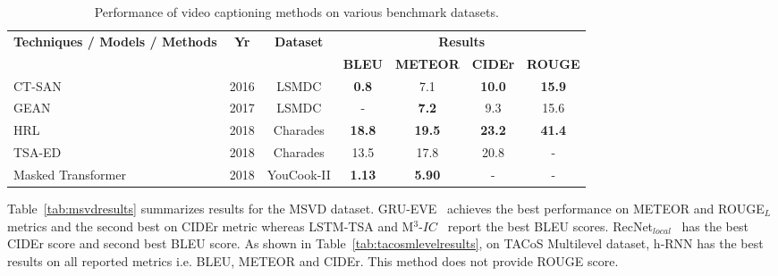 \documentclass[10pt,journal,compsoc]{IEEEtran}
\begin{document}
\begin{table*}[htbp]
  \centering
  \small
  \setlength{\tabcolsep}{10.0pt}       %

\caption{Performance of video captioning methods on various benchmark datasets.}
 \vspace{-2mm}
    \begin{tabular}{|p{15.43em}|c|c|c|c|c|c|}
    \hline
    \multirow{2}[1]{*}{\textbf{Techniques / Models / Methods}} & \multirow{2}[1]{*}{\textbf{Yr}} & \multirow{2}[1]{*}{\textbf{Dataset}} & \multicolumn{4}{c|}{\textbf{Results}} \\
\cline{4-7}    \multicolumn{1}{|l|}{} & & & \textbf{BLEU} & \textbf{METEOR} & \textbf{CIDEr} & \textbf{ROUGE} \\
    \hline

    CT-SAN \cite{yu2016end}  & 2016  & LSMDC & \textbf{0.8}  & 7.1  & \textbf{10.0}  & \textbf{15.9} \\
    \hline
    GEAN \cite{Yu_2017_CVPR} & 2017  & LSMDC & - & \textbf{7.2} & 9.3 & 15.6 \\
    \hline
    \hline
    HRL \cite{wang2017video}  & 2018  & Charades & \textbf{18.8}  & \textbf{19.5}  & \textbf{23.2}  & \textbf{41.4} \\
    \hline
    TSA-ED~\cite{wu2018interpretable} & 2018  & Charades & 13.5 & 17.8 & 20.8 & - \\
    \hline
    \hline
    Masked Transformer~\cite{zhou2018end} & 2018 & YouCook-II & \textbf{1.13} & \textbf{5.90} & - & - \\
    \hline
    \end{tabular}%
  \label{tab:miscdatasetsresults}%
 \end{table*}%

Table~\ref{tab:msvdresults} summarizes results for the MSVD dataset. GRU-EVE~\cite{gruevehftsem} 
achieves the best performance on METEOR and ROUGE$_L$ metrics and the second best on CIDEr metric whereas LSTM-TSA \cite{Pan_2017_CVPR} and M$^3$-${IC}$~\cite{wang2018m3} report the best BLEU scores. RecNet$_{local}$~\cite{wang2018reconstruction} has the best CIDEr score and second best BLEU score. As shown in Table~\ref{tab:tacosmlevelresults}, on TACoS Multilevel dataset, h-RNN \cite{yu2016video} has the best results on all reported metrics i.e. BLEU, METEOR and CIDEr. This method does not provide ROUGE score.
\end{document}
